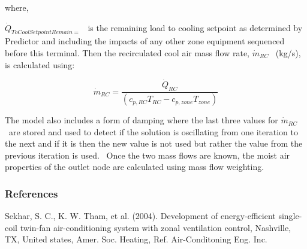 where,

\({\dot Q_{ToCoolSetpointRemain = }}\) ~is the remaining load to cooling setpoint as determined by Predictor and including the impacts of any other zone equipment sequenced before this terminal. Then the recirculated cool air mass flow rate, \({\dot m_{RC}}\) ~(kg/s), is calculated using:

\begin{equation}
{\dot m_{RC}} = \frac{{{{\dot Q}_{RC}}}}{{\left( {{c_{p,RC}}{T_{RC}} - {c_{p,zone}}{T_{zone}}} \right)}}
\end{equation}

The model also includes a form of damping where the last three values for \({\dot m_{RC}}\) ~are stored and used to detect if the solution is oscillating from one iteration to the next and if it is then the new value is not used but rather the value from the previous iteration is used.~ Once the two mass flows are known, the moist air properties of the outlet node are calculated using mass flow weighting.

\subsubsection{References}\label{references-6}

Sekhar, S. C., K. W. Tham, et al. (2004). Development of energy-efficient single-coil twin-fan air-conditioning system with zonal ventilation control, Nashville, TX, United states, Amer. Soc. Heating, Ref. Air-Conditoning Eng. Inc.

